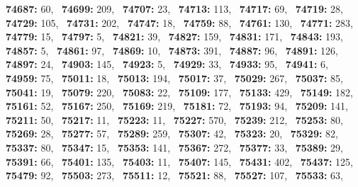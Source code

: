\textbf{74687:} 60,\allowbreak~ 
\textbf{74699:} 209,\allowbreak~ 
\textbf{74707:} 23,\allowbreak~ 
\textbf{74713:} 113,\allowbreak~ 
\textbf{74717:} 69,\allowbreak~ 
\textbf{74719:} 28,\allowbreak~ 
\textbf{74729:} 105,\allowbreak~ 
\textbf{74731:} 202,\allowbreak~ 
\textbf{74747:} 18,\allowbreak~ 
\textbf{74759:} 88,\allowbreak~ 
\textbf{74761:} 130,\allowbreak~ 
\textbf{74771:} 283,\allowbreak~ 
\textbf{74779:} 15,\allowbreak~ 
\textbf{74797:} 5,\allowbreak~ 
\textbf{74821:} 39,\allowbreak~ 
\textbf{74827:} 159,\allowbreak~ 
\textbf{74831:} 171,\allowbreak~ 
\textbf{74843:} 193,\allowbreak~ 
\textbf{74857:} 5,\allowbreak~ 
\textbf{74861:} 97,\allowbreak~ 
\textbf{74869:} 10,\allowbreak~ 
\textbf{74873:} 391,\allowbreak~ 
\textbf{74887:} 96,\allowbreak~ 
\textbf{74891:} 126,\allowbreak~ 
\textbf{74897:} 24,\allowbreak~ 
\textbf{74903:} 145,\allowbreak~ 
\textbf{74923:} 5,\allowbreak~ 
\textbf{74929:} 33,\allowbreak~ 
\textbf{74933:} 95,\allowbreak~ 
\textbf{74941:} 6,\allowbreak~ 
\textbf{74959:} 75,\allowbreak~ 
\textbf{75011:} 18,\allowbreak~ 
\textbf{75013:} 194,\allowbreak~ 
\textbf{75017:} 37,\allowbreak~ 
\textbf{75029:} 267,\allowbreak~ 
\textbf{75037:} 85,\allowbreak~ 
\textbf{75041:} 19,\allowbreak~ 
\textbf{75079:} 220,\allowbreak~ 
\textbf{75083:} 22,\allowbreak~ 
\textbf{75109:} 177,\allowbreak~ 
\textbf{75133:} 429,\allowbreak~ 
\textbf{75149:} 182,\allowbreak~ 
\textbf{75161:} 52,\allowbreak~ 
\textbf{75167:} 250,\allowbreak~ 
\textbf{75169:} 219,\allowbreak~ 
\textbf{75181:} 72,\allowbreak~ 
\textbf{75193:} 94,\allowbreak~ 
\textbf{75209:} 141,\allowbreak~ 
\textbf{75211:} 50,\allowbreak~ 
\textbf{75217:} 11,\allowbreak~ 
\textbf{75223:} 11,\allowbreak~ 
\textbf{75227:} 570,\allowbreak~ 
\textbf{75239:} 212,\allowbreak~ 
\textbf{75253:} 80,\allowbreak~ 
\textbf{75269:} 28,\allowbreak~ 
\textbf{75277:} 57,\allowbreak~ 
\textbf{75289:} 259,\allowbreak~ 
\textbf{75307:} 42,\allowbreak~ 
\textbf{75323:} 20,\allowbreak~ 
\textbf{75329:} 82,\allowbreak~ 
\textbf{75337:} 80,\allowbreak~ 
\textbf{75347:} 15,\allowbreak~ 
\textbf{75353:} 141,\allowbreak~ 
\textbf{75367:} 272,\allowbreak~ 
\textbf{75377:} 33,\allowbreak~ 
\textbf{75389:} 29,\allowbreak~ 
\textbf{75391:} 66,\allowbreak~ 
\textbf{75401:} 135,\allowbreak~ 
\textbf{75403:} 11,\allowbreak~ 
\textbf{75407:} 145,\allowbreak~ 
\textbf{75431:} 402,\allowbreak~ 
\textbf{75437:} 125,\allowbreak~ 
\textbf{75479:} 92,\allowbreak~ 
\textbf{75503:} 273,\allowbreak~ 
\textbf{75511:} 12,\allowbreak~ 
\textbf{75521:} 88,\allowbreak~ 
\textbf{75527:} 107,\allowbreak~ 
\textbf{75533:} 63,\allowbreak~ 
